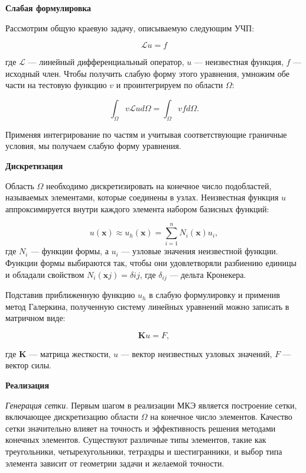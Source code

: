 \textbf{Слабая формулировка}

Рассмотрим общую краевую задачу, описываемую следующим УЧП:

\begin{equation*}
    \mathcal{L}u=f
\end{equation*}

где $\mathcal{L}$ — линейный дифференциальный оператор,
$u$ — неизвестная функция, $f$ — исходный член.
Чтобы получить слабую форму этого уравнения,
умножим обе части на тестовую функцию
$v$ и проинтегрируем по области $\Omega$:

\begin{equation*}
    \int_{\Omega} v \mathcal{L}u d\Omega = \int_{\Omega} vf d\Omega.
\end{equation*}

Применяя интегрирование по частям и учитывая соответствующие
граничные условия, мы получаем слабую форму уравнения.

\textbf{Дискретизация}

Область $\Omega$ необходимо дискретизировать на конечное число подобластей,
называемых элементами, которые соединены в узлах.
Неизвестная функция $u$ аппроксимируется внутри каждого
элемента набором базисных функций:

\begin{equation*}
    u(\mathbf{x}) \approx u_h(\mathbf{x}) = \sum_{i=1}^{n} N_i(\mathbf{x}) u_i,
\end{equation*}
где $N_i$ — функции формы, а $u_i$ — узловые значения неизвестной функции.
Функции формы выбираются так, чтобы они удовлетворяли разбиению единицы
и обладали свойством $N_i(\mathbf{x}j)=\delta{ij}$,
где $\delta_{ij}$ — дельта Кронекера.

Подставив приближенную функцию $u_h$ в слабую формулировку и применив
метод Галеркина, полученную систему линейных
уравнений можно записать в матричном виде:

\begin{equation*}
    \mathbf{K} u = F,
\end{equation*}

где $\mathbf{K}$ — матрица жесткости, $u$ — вектор
неизвестных узловых значений, $F$ — вектор силы. %

\textbf{Реализация}

\textit{Генерация сетки.}
Первым шагом в реализации МКЭ является построение сетки,
включающее дискретизацию области $\Omega$ на конечное число элементов.
Качество сетки значительно влияет на точность
и эффективность решения методами конечных элементов.
Существуют различные типы элементов, такие как треугольники,
четырехугольники, тетраэдры и шестигранники, и выбор типа элемента
зависит от геометрии задачи и желаемой точности.

